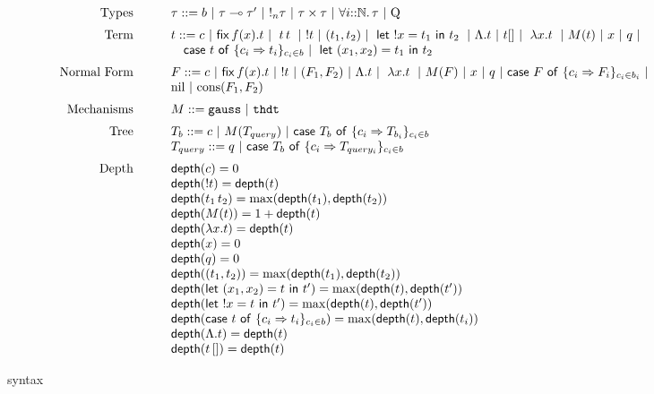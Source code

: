 \documentclass{article}
\begin{document}
 \begin{figure}[h]
 $$
 \begin{array}{rcl}
     \text{Types} & \quad & \tau ::= b \sep \tau \multimap \tau' \sep !_n \tau \sep
     \tau \times \tau \sep \tforallN{i}{\tau} \sep \query \\[2mm]

     \text{Term} & \quad & t ::= c \sep \fix{t} \sep \app{t}{t} \sep !t \sep (t_1,t_2) \sep  \letx{!x}{t_1}{t_2} \sep \Lambda.t \sep t[] \sep \abs{x}{t} \sep  M(t) \sep x \sep q \sep\\
     && \quad   \tcaseof{t}\ \{c_i \Rightarrow t_i\}_{c_i \in b}  \sep \letx{(x_1,x_2)}{t_1}{t_2} \\[2mm]
      
     \text{Normal Form} &\quad & F ::=  c \sep \fix{t} \sep !t \sep (F_1, F_2) \sep \Lambda. t \sep \abs{x}{t} \sep M(F) \sep x \sep q \sep \tcaseof{F}\ \{c_i \Rightarrow F_i\}_{c_i \in b_i} \sep\\
     && \enil \sep \econs(F_1,F_2)  \\[2mm]

     \text{Mechanisms} &\quad & M ::=  {\tt gauss} \sep {\tt thdt} \\[2mm]


	\text{Tree} &\quad& T_b :: = c \sep M(T_{query}) \sep \tcaseof{T_b}\ \{ c_i \Rightarrow T_{b_i}\}_{c_i \in b} \\

	\text{} &\quad& T_{query} :: = q \sep \tcaseof{T_b}\ \{ c_i \Rightarrow T_{query_i}\}_{c_i \in b} \\[2mm]
     \text{Depth} &\quad&   \depth(c) = 0 \\
       &\quad& \depth(!t) = \depth(t) \\
           &\quad&      \depth( \app{t_1}{t_2} ) = \max(\depth(t_1), \depth(t_2)) \\
            &\quad&  \depth(M(t)) = 1 + \depth(t) \\
             &\quad&  \depth(\abs{x}{t}) = \depth(t) \\
              &\quad& \depth(x) = 0 \\
              & \quad & \depth(q) = 0 \\
              & \quad & \depth((t_1, t_2)) = \max(\depth(t_1), \depth(t_2))\\
              & \quad & \depth(\letx{(x_1, x_2)}{t}{t'}) = \max(\depth(t), \depth(t'))\\
              & \quad & \depth(\letx{!x}{t}{t'}) = \max(\depth(t), \depth(t'))\\
              & \quad & \depth(\tcaseof{t}\ \{c_i \Rightarrow t_i\}_{c_i \in b}) = \max(\depth(t), \depth(t_i))\\
            & \quad & \depth(\Lambda.t) = \depth(t)\\
              & \quad & \depth(t\, []) = \depth(t)\\
\end{array}
$$
\caption{syntax}
\end{figure}
\end{document}
